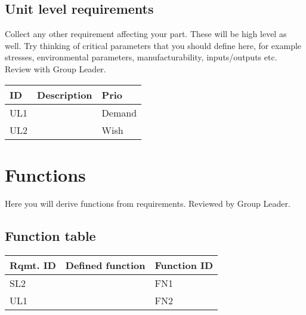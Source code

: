 \documentclass[12pt,a4paper]{article}
\begin{document}
	\subsection*{Unit level requirements}
		Collect any other requirement affecting your part. These will be high level as well. Try thinking of critical parameters that you should define here, for example stresses, environmental parameters, manufacturability, inputs/outputs etc. Review with Group Leader.
		\begin{table}[H]
			\centering
			\begin{tabular}{|l|l|l|}
				\hline
				\textbf{ID}& \textbf{Description} & \textbf{Prio} \\
				\hline
				UL1&  & Demand \\
				\hline
				UL2&  & Wish \\
				\hline
			\end{tabular}
		\end{table}
		
\section*{Functions}
	Here you will derive functions from requirements. Reviewed by Group Leader.
	
	\subsection*{Function table}
		\begin{table}[H]
			\centering
			\begin{tabular}{|l|l|l|}
				\hline
				\textbf{Rqmt. ID}& \textbf{Defined function} & \textbf{Function ID} \\
				\hline
				SL2&  & FN1 \\
				\hline
				UL1&  & FN2 \\
				\hline
			\end{tabular}
		\end{table}
\end{document}
